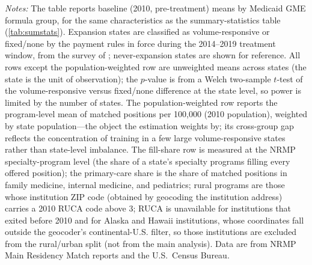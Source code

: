 \begin{landscape}
\begin{table}
\centering
\singlespacing
\small
\begin{threeparttable}
\caption{Baseline Balance Across Medicaid GME Formula Groups (2010)}
\label{atab:balance}

\begin{tablenotes}\footnotesize
\item \textit{Notes:} The table reports baseline (2010, pre-treatment) means by Medicaid GME formula group, for the same characteristics as the summary-statistics table (\cref{tab:sumstats}). Expansion states are classified as volume-responsive or fixed/none by the payment rules in force during the 2014--2019 treatment window, from the survey of \textcite{henderson2016}; never-expansion states are shown for reference. All rows except the population-weighted row are unweighted means across states (the state is the unit of observation); the $p$-value is from a Welch two-sample $t$-test of the volume-responsive versus fixed/none difference at the state level, so power is limited by the number of states. The population-weighted row reports the program-level mean of matched positions per 100{,}000 (2010 population), weighted by state population---the object the estimation weights by; its cross-group gap reflects the concentration of training in a few large volume-responsive states rather than state-level imbalance. The fill-share row is measured at the NRMP specialty-program level (the share of a state's specialty programs filling every offered position); the primary-care share is the share of matched positions in family medicine, internal medicine, and pediatrics; rural programs are those whose institution ZIP code (obtained by geocoding the institution address) carries a 2010 RUCA code above 3; RUCA is unavailable for institutions that exited before 2010 and for Alaska and Hawaii institutions, whose coordinates fall outside the geocoder's continental-U.S. filter, so those institutions are excluded from the rural/urban split (not from the main analysis). Data are from NRMP Main Residency Match reports and the U.S.\ Census Bureau.
\end{tablenotes}
\end{threeparttable}
\end{table}
\end{landscape}

